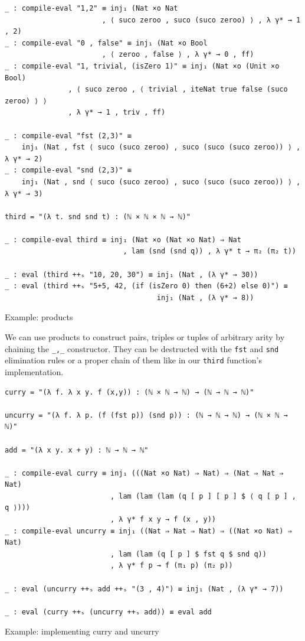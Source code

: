 \begin{listing}[H]
\begin{verbatim}
_ : compile-eval "1,2" ≡ inj₁ (Nat ×o Nat
                       , ⟨ suco zeroo , suco (suco zeroo) ⟩ , λ γ* → 1 , 2)
_ : compile-eval "0 , false" ≡ inj₁ (Nat ×o Bool
                       , ⟨ zeroo , false ⟩ , λ γ* → 0 , ff)
_ : compile-eval "1, trivial, (isZero 1)" ≡ inj₁ (Nat ×o (Unit ×o Bool)
               , ⟨ suco zeroo , ⟨ trivial , iteNat true false (suco zeroo) ⟩ ⟩
               , λ γ* → 1 , triv , ff)

_ : compile-eval "fst (2,3)" ≡
    inj₁ (Nat , fst ⟨ suco (suco zeroo) , suco (suco (suco zeroo)) ⟩ , λ γ* → 2)
_ : compile-eval "snd (2,3)" ≡
    inj₁ (Nat , snd ⟨ suco (suco zeroo) , suco (suco (suco zeroo)) ⟩ , λ γ* → 3)

third = "(λ t. snd snd t) : (ℕ × ℕ × ℕ → ℕ)"

_ : compile-eval third ≡ inj₁ (Nat ×o (Nat ×o Nat) ⇒ Nat
                            , lam (snd (snd q)) , λ γ* t → π₂ (π₂ t))

_ : eval (third ++ₛ "10, 20, 30") ≡ inj₁ (Nat , (λ γ* → 30))
_ : eval (third ++ₛ "5+5, 42, (if (isZero 0) then (6+2) else 0)") ≡
                                    inj₁ (Nat , (λ γ* → 8))
\end{verbatim}
\caption{Example: products}
\label{code:examples-prod}
\end{listing}

We can use products to construct pairs, triples or tuples of arbitrary arity by chaining the \verb$_,_$ constructor. They can be destructed with the \verb$fst$ and \verb$snd$ elimination rules or a proper chain of them like in our \verb$third$ function's implementation.

\begin{listing}[H]
\begin{verbatim}
curry = "(λ f. λ x y. f (x,y)) : (ℕ × ℕ → ℕ) → (ℕ → ℕ → ℕ)"

uncurry = "(λ f. λ p. (f (fst p)) (snd p)) : (ℕ → ℕ → ℕ) → (ℕ × ℕ → ℕ)"

add = "(λ x y. x + y) : ℕ → ℕ → ℕ"

_ : compile-eval curry ≡ inj₁ (((Nat ×o Nat) ⇒ Nat) ⇒ (Nat ⇒ Nat ⇒ Nat)
                         , lam (lam (lam (q [ p ] [ p ] $ ⟨ q [ p ] , q ⟩)))
                         , λ γ* f x y → f (x , y))
_ : compile-eval uncurry ≡ inj₁ ((Nat ⇒ Nat ⇒ Nat) ⇒ ((Nat ×o Nat) ⇒ Nat)
                         , lam (lam (q [ p ] $ fst q $ snd q))
                         , λ γ* f p → f (π₁ p) (π₂ p))

_ : eval (uncurry ++ₛ add ++ₛ "(3 , 4)") ≡ inj₁ (Nat , (λ γ* → 7))

_ : eval (curry ++ₛ (uncurry ++ₛ add)) ≡ eval add
\end{verbatim}
\caption{Example: implementing curry and uncurry}
\label{code:examples-curry}
\end{listing}

